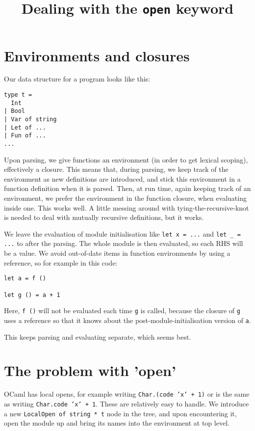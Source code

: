 \documentclass[10pt]{article}
\begin{document}
\title{Dealing with the \texttt{open} keyword}
\maketitle

\section{Environments and closures}

Our data structure for a program looks like this:

\begin{verbatim}
type t =
  Int
| Bool
| Var of string
| Let of ...
| Fun of ...
...
\end{verbatim}

Upon parsing, we give functions an environment (in order to get lexical scoping), effectively a closure. This means that, during parsing, we keep track of the environment as new definitions are introduced, and stick this environment in a function definition when it is parsed. Then, at run time, again keeping track of an environment, we prefer the environment in the function closure, when evaluating inside one. This works well. A little messing around with tying-the-recursive-knot is needed to deal with mutually recursive definitions, but it works.

We leave the evaluation of module initialisation like \texttt{let x = ...} and \texttt{let \_ = ...} to after the parsing. The whole module is then evaluated, so each RHS will be a value. We avoid out-of-date items in function environments by using a reference, so for example in this code:

\begin{verbatim}
let a = f ()

let g () = a + 1
\end{verbatim}

Here, \texttt{f ()} will not be evaluated each time \texttt{g} is called, because the closure of \texttt{g} uses a reference so that it knows about the post-module-initialisation version of \texttt{a}.

This keeps parsing and evaluating separate, which seems best.

\section{The problem with 'open'}

OCaml has local opens, for example writing \texttt{Char.(code 'x' + 1)} or is the same as writing \texttt{Char.code 'x' + 1}. These are relatively easy to handle. We introduce a new \texttt{LocalOpen of string * t} node in the tree, and upon encountering it, open the module up and bring its names into the environment at top level.
\end{document}
